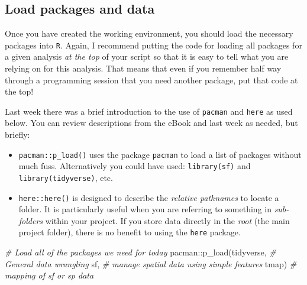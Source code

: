 \documentclass[
]{book}
\newenvironment{Shaded}{\begin{snugshade}}{\end{snugshade}}
\newcommand{\CommentTok}[1]{\textcolor[rgb]{0.56,0.35,0.01}{\textit{#1}}}
\newcommand{\FunctionTok}[1]{\textcolor[rgb]{0.00,0.00,0.00}{#1}}
\newcommand{\NormalTok}[1]{#1}
\newcommand{\SpecialCharTok}[1]{\textcolor[rgb]{0.00,0.00,0.00}{#1}}
\providecommand{\tightlist}{%
  \setlength{\itemsep}{0pt}\setlength{\parskip}{0pt}}
\newenvironment{rmdtip}[1]
  {
  \begin{itemize}
  \renewcommand{\labelitemi}{
    \raisebox{-.7\height}[0pt][0pt]{
      {\setkeys{Gin}{width=3em,keepaspectratio}\texttt{[image: images/\#1]}}
    }
  }
  \setlength{\fboxsep}{1em}
  \begin{tip}
  \item
  }
  {
  \end{tip}
  \end{itemize}
  }
\begin{document}
\hypertarget{load-packages-and-data}{%
\subsection{Load packages and data}\label{load-packages-and-data}}

Once you have created the working environment, you should load the necessary packages into \texttt{R}. Again, I recommend putting the code for loading all packages for a given analysis \emph{at the top} of your script so that it is easy to tell what you are relying on for this analysis. That means that even if you remember half way through a programming session that you need another package, put that code at the top!

\begin{rmdtip}{tip}

Last week there was a brief introduction to the use of \texttt{pacman} and \texttt{here} as used below. You can review descriptions from the eBook and last week as needed, but briefly:

\begin{itemize}
\tightlist
\item
  \texttt{pacman::p\_load()} uses the package \texttt{pacman} to load a list of packages without much fuss. Alternatively you could have used: \texttt{library(sf)} and \texttt{library(tidyverse)}, etc.
\item
  \texttt{here::here()} is designed to describe the \emph{relative pathnames} to locate a folder. It is particularly useful when you are referring to something in \emph{sub-folders} within your project. If you store data directly in the \emph{root} (the main project folder), there is no benefit to using the \texttt{here} package.
\end{itemize}

\end{rmdtip}

\begin{Shaded}
\begin{Highlighting}[]
\CommentTok{\# Load all of the packages we need for today}
\NormalTok{pacman}\SpecialCharTok{::}\FunctionTok{p\_load}\NormalTok{(tidyverse,   }\CommentTok{\# General data wrangling}
\NormalTok{               sf,          }\CommentTok{\# manage spatial data using simple features}
\NormalTok{               tmap)        }\CommentTok{\# mapping of sf or sp data}
\end{Highlighting}
\end{Shaded}
\end{document}
